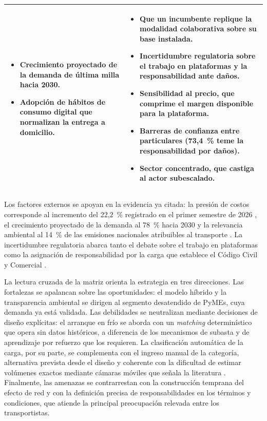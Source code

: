 {\begin{table}[H]
\begin{tabular}{p{6.8cm}p{6.8cm}}
\begin{itemize}[leftmargin=1.2em,topsep=1pt,itemsep=1pt]
            \item Crecimiento proyectado de la demanda de última milla hacia 2030.
            \item Adopción de hábitos de consumo digital que normalizan la entrega a domicilio.
        \end{itemize}
        &
        \begin{itemize}[leftmargin=1.2em,topsep=1pt,itemsep=1pt]
            \item Que un incumbente replique la modalidad colaborativa sobre su base instalada.
            \item Incertidumbre regulatoria sobre el trabajo en plataformas y la responsabilidad ante daños.
            \item Sensibilidad al precio, que comprime el margen disponible para la plataforma.
            \item Barreras de confianza entre particulares (73,4~\% teme la responsabilidad por daños).
            \item Sector concentrado, que castiga al actor subescalado.
        \end{itemize} \\
        \bottomrule
    \end{tabular}
\end{table}

Los factores externos se apoyan en la evidencia ya citada: la presión de costos corresponde al incremento del 22,2~\% registrado en el primer semestre de 2026 \parencite{CEDOL2025}, el crecimiento proyectado de la demanda al 78~\% hacia 2030 \parencite{WEF2020} y la relevancia ambiental al 14~\% de las emisiones nacionales atribuibles al transporte \parencite{InventarioGEI2024}. La incertidumbre regulatoria abarca tanto el debate sobre el trabajo en plataformas \parencite{OIT2020} como la asignación de responsabilidad por la carga que establece el Código Civil y Comercial \parencite{CCyC2014}.

La lectura cruzada de la matriz orienta la estrategia en tres direcciones. Las fortalezas se apalancan sobre las oportunidades: el modelo híbrido y la transparencia ambiental se dirigen al segmento desatendido de PyMEs, cuya demanda ya está validada. Las debilidades se neutralizan mediante decisiones de diseño explícitas: el arranque en frío se aborda con un \emph{matching} determinístico que opera sin datos históricos, a diferencia de los mecanismos de subasta \parencite{AkamatsuOyama2023} y de aprendizaje por refuerzo \parencite{SalehEtAl2024} que los requieren. La clasificación automática de la carga, por su parte, se complementa con el ingreso manual de la categoría, alternativa prevista desde el diseño y coherente con la dificultad de estimar volúmenes exactos mediante cámaras móviles que señala la literatura \parencite{NaumannEtAl2023}. Finalmente, las amenazas se contrarrestan con la construcción temprana del efecto de red y con la definición precisa de responsabilidades en los términos y condiciones, que atiende la principal preocupación relevada entre los transportistas.

}
